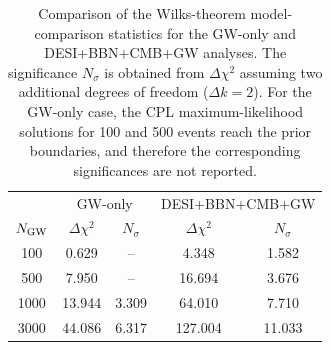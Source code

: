 \begin{table}[t!]
\caption{
Comparison of the Wilks-theorem model-comparison statistics for the
GW-only and DESI+BBN+CMB+GW analyses.
The significance $N_\sigma$ is obtained from $\Delta\chi^2$
assuming two additional degrees of freedom ($\Delta k=2$).
For the GW-only case, the CPL maximum-likelihood solutions for
100 and 500 events reach the prior boundaries, and therefore the
corresponding significances are not reported.
}
\label{tab:gw_and_desi_bbn_cmb_gw_cpl_wilks}
\centering
\small
\begin{ruledtabular}
\begin{tabular}{c|cc|cc}
& \multicolumn{2}{c|}{GW-only}
& \multicolumn{2}{c}{DESI+BBN+CMB+GW}
\\
$N_{\rm GW}$
& $\Delta\chi^2$
& $N_\sigma$
& $\Delta\chi^2$
& $N_\sigma$
\\
\hline
100
& 0.629
& --
& 4.348
& 1.582
\\
500
& 7.950
& --
& 16.694
& 3.676
\\
1000
& 13.944
& 3.309
& 64.010
& 7.710
\\
3000
& 44.086
& 6.317
& 127.004
& 11.033
\\
\end{tabular}
\end{ruledtabular}
\end{table}
